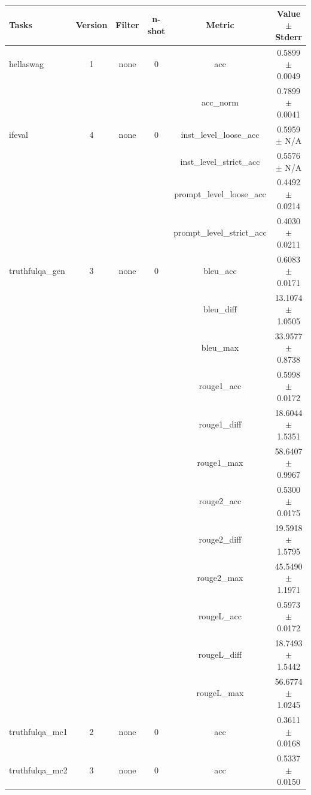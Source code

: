 \documentclass{ifacconf}
\begin{document}
\vfill
\clearpage
\pagebreak

\begin{strip}
\begin{minipage}{\textwidth}
\begin{table}[H]
    \centering
    \begin{tabular}{|l|c|c|c|c|c|}
    \hline
    \textbf{Tasks} & \textbf{Version} & \textbf{Filter} & \textbf{n-shot} & \textbf{Metric} & \textbf{Value} $\pm$ \textbf{Stderr} \\ \hline
    hellaswag & 1 & none & 0 & acc & 0.5899 $\pm$ 0.0049 \\ \hline
    & & & & acc\_norm & 0.7899 $\pm$ 0.0041 \\ \hline
    ifeval & 4 & none & 0 & inst\_level\_loose\_acc & 0.5959 $\pm$ N/A \\ \hline
    & & & & inst\_level\_strict\_acc & 0.5576 $\pm$ N/A \\ \hline
    & & & & prompt\_level\_loose\_acc & 0.4492 $\pm$ 0.0214 \\ \hline
    & & & & prompt\_level\_strict\_acc & 0.4030 $\pm$ 0.0211 \\ \hline
    truthfulqa\_gen & 3 & none & 0 & bleu\_acc & 0.6083 $\pm$ 0.0171 \\ \hline
    & & & & bleu\_diff & 13.1074 $\pm$ 1.0505 \\ \hline
    & & & & bleu\_max & 33.9577 $\pm$ 0.8738 \\ \hline
    & & & & rouge1\_acc & 0.5998 $\pm$ 0.0172 \\ \hline
    & & & & rouge1\_diff & 18.6044 $\pm$ 1.5351 \\ \hline
    & & & & rouge1\_max & 58.6407 $\pm$ 0.9967 \\ \hline
    & & & & rouge2\_acc & 0.5300 $\pm$ 0.0175 \\ \hline
    & & & & rouge2\_diff & 19.5918 $\pm$ 1.5795 \\ \hline
    & & & & rouge2\_max & 45.5490 $\pm$ 1.1971 \\ \hline
    & & & & rougeL\_acc & 0.5973 $\pm$ 0.0172 \\ \hline
    & & & & rougeL\_diff & 18.7493 $\pm$ 1.5442 \\ \hline
    & & & & rougeL\_max & 56.6774 $\pm$ 1.0245 \\ \hline
    truthfulqa\_mc1 & 2 & none & 0 & acc & 0.3611 $\pm$ 0.0168 \\ \hline
    truthfulqa\_mc2 & 3 & none & 0 & acc & 0.5337 $\pm$ 0.0150 \\ \hline
    \end{tabular}
    \label{tab:llama31_q5km}
    \end{table}


\end{minipage}
\end{strip}
\end{document}

